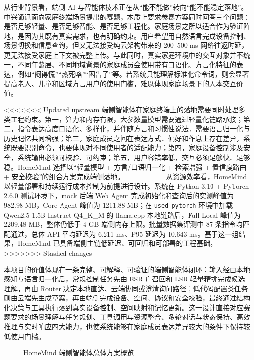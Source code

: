 \documentclass[12pt,a4paper,oneside]{ctexrep}
\begin{document}
从行业背景看，端侧 AI 与智能体技术正在从“能不能做”转向“能不能稳定落地”。中兴通讯面向家庭终端场景提出的赛题，本质上要求参赛方案同时回答三个问题：是否足够轻量、是否足够智能、是否足够工程化。家庭场景之所以适合作为验证阵地，是因为其既有真实需求，也有明确约束。用户希望用自然语言完成设备控制、场景切换和信息查询，但又无法接受纯云架构带来的 200--500 ms 网络往返时延，更无法接受家庭上下文被完整上传。与此同时，真实家庭环境中的交互对象并不统一，不同年龄层、不同地域背景的家庭成员会使用带有口语化、方言化特征的表达，例如“闷得慌”“热死咯”“困告了”等。若系统只能理解标准化命令词，则会显著提高老人、儿童和区域方言用户的使用门槛，难以体现家庭场景下的人本交互价值。

<<<<<<< Updated upstream
端侧智能体在家庭终端上的落地需要同时处理多类工程约束。第一，算力和内存有限，大参数量模型需要通过轻量化链路承接；第二，指令表达高度口语化、多样化，并伴随方言和习惯性说法，需要语言归一化与历史记忆共同增强；第三，家庭成员之间在表达方式、偏好和作息上存在差异，系统既要识别命令，也要体现对不同使用者的适配能力；第四，家庭设备控制涉及安全，系统输出必须可校验、可约束；第五，用户容错率低，交互必须足够快、足够稳。HomeMind 选择以“轻量模型 + 方言/口语归一化 + 检索增强 + 置信度路由 + 安全校验”的组合方案完成端侧落地。
=======
从资源效率看，HomeMind 以轻量部署和持续运行成本控制为前提进行设计。系统在 Python 3.10 + PyTorch 2.6.0 测试环境下，mock 后端 Web Agent 完成初始化和查询后的实测峰值为 982.98 MB，Core Agent 峰值为 1211.88 MB；在 \texttt{used\_pytorch} 环境中加载 Qwen2.5-1.5B-Instruct-Q4\_K\_M 的 llama.cpp 本地链路后，Full Local 峰值为 2209.48 MB，整体仍低于 4 GB 端侧内存上限。批量数据集评测中 87 条指令均匹配通过，总体 API 平均延迟为 6.211 ms、P95 延迟为 10.643 ms。基于这一组结果，HomeMind 已具备端侧主链低延迟、可回归和可部署的工程基础。
>>>>>>> Stashed changes

本项目的价值体现在一条完整、可解释、可验证的端侧智能体闭环：输入经由本地感知与语言归一化后，常规控制任务先由 BSR 广召回和 LSR 轻量精排完成候选理解，再由 Router 决定本地直达、云端协同或澄清询问路径；低代码配置类任务则由云端先生成草案，再由端侧完成设备、空间、协议和安全校验，最终通过结构化决策与工具执行落到真实设备控制、空间映射和记忆更新。这一设计直接对应赛题要求的场景理解与任务规划、工具调用与资源整合、多轮对话与状态保持、高效推理与实时响应四大能力，也使系统能够在家庭成员表达差异较大的条件下保持较低使用门槛。

\begin{figure}[H]
    \centering
    \caption{HomeMind 端侧智能体总体方案概览}
    \label{fig:overview-1-2}
\end{figure}
\end{document}
